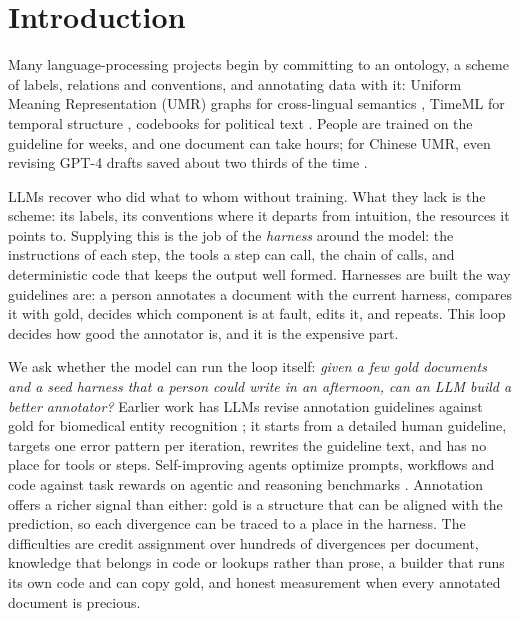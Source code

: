\section{Introduction}
\label{sec:intro}

Many language-processing projects begin by committing to an ontology, a scheme of labels, relations and conventions, and annotating data with it: Uniform Meaning Representation (UMR) graphs for cross-lingual semantics \citep{vangysel2021designing,bonn2024building}, TimeML for temporal structure \citep{pustejovsky2003timeml}, codebooks for political text \citep{lehmann2026manifesto}. People are trained on the guideline for weeks, and one document can take hours; for Chinese UMR, even revising GPT-4 drafts saved about two thirds of the time \citep{sun2024chinese}.

LLMs recover who did what to whom without training. What they lack is the scheme: its labels, its conventions where it departs from intuition, the resources it points to. Supplying this is the job of the \emph{harness} around the model: the instructions of each step, the tools a step can call, the chain of calls, and deterministic code that keeps the output well formed. Harnesses are built the way guidelines are: a person annotates a document with the current harness, compares it with gold, decides which component is at fault, edits it, and repeats. This loop decides how good the annotator is, and it is the expensive part.

We ask whether the model can run the loop itself: \emph{given a few gold documents and a seed harness that a person could write in an afternoon, can an LLM build a better annotator?} Earlier work has LLMs revise annotation guidelines against gold for biomedical entity recognition \citep{kim2026refining}; it starts from a detailed human guideline, targets one error pattern per iteration, rewrites the guideline text, and has no place for tools or steps. Self-improving agents optimize prompts, workflows and code against task rewards on agentic and reasoning benchmarks \citep{zhang2026self,hu2025automated}. Annotation offers a richer signal than either: gold is a structure that can be aligned with the prediction, so each divergence can be traced to a place in the harness. The difficulties are credit assignment over hundreds of divergences per document, knowledge that belongs in code or lookups rather than prose, a builder that runs its own code and can copy gold, and honest measurement when every annotated document is precious.

